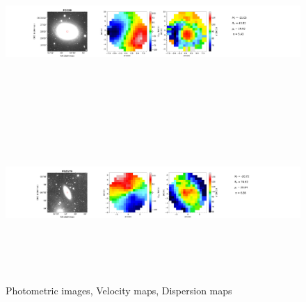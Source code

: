 \documentclass{aa}
\begin{document}
\begin{figure}[!htb]
   \includegraphics[width=21cm,height=6cm,keepaspectratio]
{../2_pipeline/1_V&S_Maps/29Velocity_map.pdf}
   \includegraphics[width=21cm,height=6cm,keepaspectratio]
{../2_pipeline/1_V&S_Maps/179Velocity_map.pdf}
         \caption{Photometric images, Velocity maps, Dispersion maps}
         \label{FigVelDis}
\end{figure}
\clearpage
%
\end{document}
